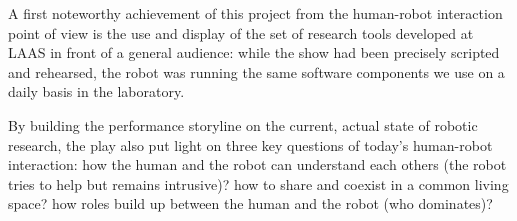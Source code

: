 A first noteworthy achievement of this project from the human-robot
interaction point of view is the use and display of the set of research tools
developed at LAAS in front of a general audience: while the show had been
precisely scripted and rehearsed, the robot was running the same software
components we use on a daily basis in the laboratory.

By building the performance storyline on the current, actual state of robotic
research,  the play also put light on three key questions of today's
human-robot interaction: how the human and the robot can understand each others
(the robot tries to help but remains intrusive)? how to share and coexist in a
common living space? how roles build up between the human and the robot (who
dominates)?

